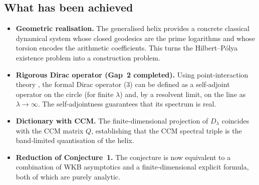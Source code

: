 \documentclass[12pt,a4paper]{article}
\begin{document}
\subsection*{What has been achieved}
\begin{itemize}
\item \textbf{Geometric realisation.} The generalised helix provides a concrete classical dynamical system whose closed geodesics are the prime logarithms and whose torsion encodes the arithmetic coefficients.  This turns the Hilbert–P\'olya existence problem into a construction problem.
\item \textbf{Rigorous Dirac operator (Gap~2 completed).} Using point‑interaction theory \cite{Albeverio1988}, the formal Dirac operator (3) can be defined as a self‑adjoint operator on the circle (for finite $\lambda$) and, by a resolvent limit, on the line as $\lambda\to\infty$.  The self‑adjointness guarantees that its spectrum is real.
\item \textbf{Dictionary with CCM.} The finite‑dimensional projection of $D_\lambda$ coincides with the CCM matrix $Q$, establishing that the CCM spectral triple is the band‑limited quantisation of the helix.
\item \textbf{Reduction of Conjecture~1.} The conjecture is now equivalent to a combination of WKB asymptotics and a finite‑dimensional explicit formula, both of which are purely analytic.
\end{itemize}
\end{document}
